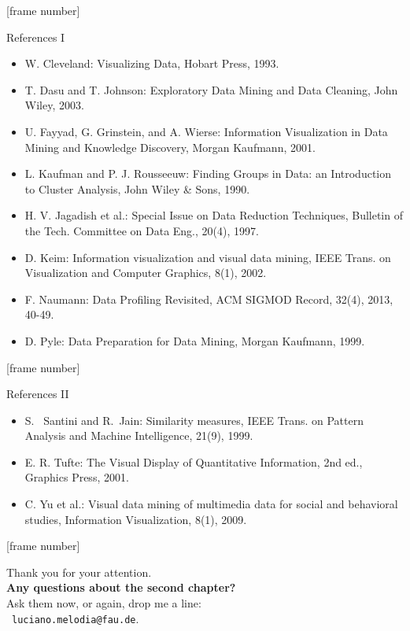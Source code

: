 \documentclass[aspectratio=169,t]{beamer}
\begin{document}
  {
    [frame number]
    \begin{frame}{References I}
        \begin{itemize}
          \item W. Cleveland: Visualizing Data, Hobart Press, 1993.
          \item T. Dasu and T. Johnson: Exploratory Data Mining and Data Cleaning, John Wiley, 2003.
          \item U. Fayyad, G. Grinstein, and A. Wierse: Information Visualization in Data Mining and Knowledge Discovery, Morgan Kaufmann, 2001.
          \item L. Kaufman and P. J. Rousseeuw: Finding Groups in Data: an Introduction to Cluster Analysis, John Wiley \& Sons, 1990.
          \item H. V. Jagadish et al.: Special Issue on Data Reduction Techniques, Bulletin of the Tech. Committee on Data Eng., 20(4), 1997.
          \item D. Keim: Information visualization and visual data mining, IEEE Trans. on Visualization and Computer Graphics, 8(1), 2002.
          \item F. Naumann: Data Profiling Revisited, ACM SIGMOD Record, 32(4), 2013, 40-49.
          \item D. Pyle: Data Preparation for Data Mining, Morgan Kaufmann, 1999.
        \end{itemize}
    \end{frame}
  }

  {
    [frame number]
    \begin{frame}{References II}
        \begin{itemize}
          \item S.  Santini and R. Jain: Similarity measures, IEEE Trans. on Pattern Analysis and Machine Intelligence, 21(9), 1999.
          \item E. R. Tufte: The Visual Display of Quantitative Information, 2nd ed., Graphics Press, 2001.
          \item C. Yu et al.: Visual data mining of multimedia data for social and behavioral studies, Information Visualization, 8(1), 2009.
        \end{itemize}
    \end{frame}
  }

  { %
    [frame number]
    \begin{frame}[c]
      \begin{center}
        Thank you for your attention.\\
        {\bf Any questions about the second chapter?}\\[0.5cm]
        Ask them now, or again, drop me a line: \\
        \faSendO \ \texttt{luciano.melodia@fau.de}.
      \end{center}
    \end{frame}
  }
\end{document}
